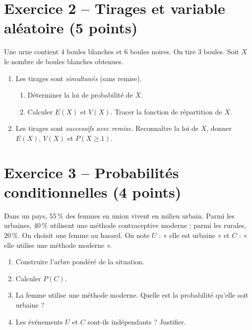 \documentclass[11pt,a4paper]{article}
\begin{document}
\section*{Exercice 2 -- Tirages et variable aléatoire (5 points)}
Une urne contient $4$ boules blanches et $6$ boules noires. On tire $3$ boules.
Soit $X$ le nombre de boules blanches obtenues.
\begin{enumerate}
  \item Les tirages sont \emph{simultanés} (sans remise).
  \begin{enumerate}[label=\alph*)]
    \item Déterminer la loi de probabilité de $X$.
    \item Calculer $E(X)$ et $V(X)$. Tracer la fonction de répartition de $X$.
  \end{enumerate}
  \item Les tirages sont \emph{successifs avec remise}. Reconnaître la loi de $X$, donner
  $E(X)$, $V(X)$ et $P(X \geqslant 1)$.
\end{enumerate}

\section*{Exercice 3 -- Probabilités conditionnelles (4 points)}
Dans un pays, $55\,\%$ des femmes en union vivent en milieu urbain. Parmi les urbaines,
$40\,\%$ utilisent une méthode contraceptive moderne ; parmi les rurales, $20\,\%$.
On choisit une femme au hasard. On note $U$ : « elle est urbaine » et $C$ : « elle utilise une méthode moderne ».
\begin{enumerate}
  \item Construire l'arbre pondéré de la situation.
  \item Calculer $P(C)$.
  \item La femme utilise une méthode moderne. Quelle est la probabilité qu'elle soit urbaine ?
  \item Les événements $U$ et $C$ sont-ils indépendants ? Justifier.
\end{enumerate}
\end{document}
